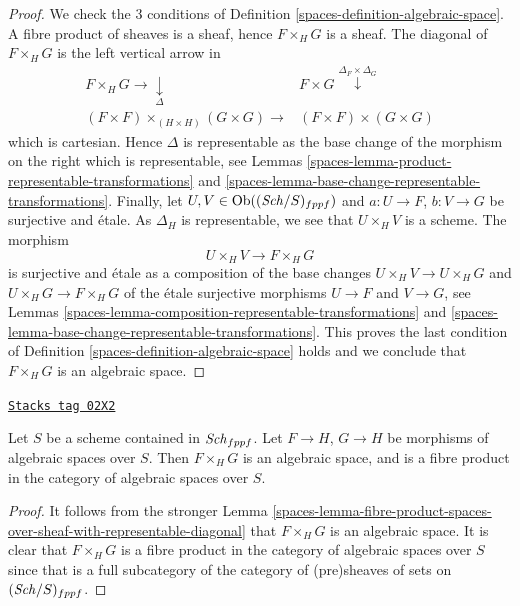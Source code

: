 \begin{proof}

We check the 3 conditions of
Definition \ref{spaces-definition-algebraic-space}.
A fibre product of sheaves is a sheaf, hence $F \times_H G$ is a sheaf.
The diagonal of $F \times_H G$ is the left vertical arrow in
$$
\begin{array}{cc}F \times_H G \longrightarrow\underset{\Delta}{\downarrow} & F \times G \overset{\Delta_F \times \Delta_G}{\downarrow} \\ (F \times F) \times_{(H \times H)} (G \times G) \longrightarrow & (F \times F) \times (G \times G)\end{array}
$$
which is cartesian. Hence $\Delta$ is representable as the base change
of the morphism on the right which is representable, see
Lemmas \ref{spaces-lemma-product-representable-transformations} and
\ref{spaces-lemma-base-change-representable-transformations}.
Finally, let $U, V \in \operatorname{Ob}((\mathit{Sch}/S)_{fppf})$
and $a : U \to F$, $b : V \to G$ be surjective and \'etale.
As $\Delta_H$ is representable, we see that $U \times_H V$ is a scheme.
The morphism
$$
U \times_H V \longrightarrow F \times_H G
$$
is surjective and \'etale as a composition of the base changes
$U \times_H V \to U \times_H G$ and $U \times_H G \to F \times_H G$
of the \'etale surjective morphisms $U \to F$ and $V \to G$, see
Lemmas \ref{spaces-lemma-composition-representable-transformations} and
\ref{spaces-lemma-base-change-representable-transformations}.
This proves the last condition of
Definition \ref{spaces-definition-algebraic-space}
holds and we conclude that $F \times_H G$ is an algebraic space.
\end{proof}

\begin{lemma}
\label{spaces-lemma-fibre-product-spaces}
\href{https://stacks.math.columbia.edu/tag/02X2}{\texttt{Stacks tag 02X2}}

Let $S$ be a scheme contained in $\mathit{Sch}_{fppf}$.
Let $F \to H$, $G \to H$ be morphisms of algebraic spaces over $S$.
Then $F \times_H G$ is an algebraic space, and is a fibre product
in the category of algebraic spaces over $S$.
\end{lemma}

\begin{proof}

It follows from the stronger
Lemma \ref{spaces-lemma-fibre-product-spaces-over-sheaf-with-representable-diagonal}
that $F \times_H G$ is an algebraic space.
It is clear that $F \times_H G$
is a fibre product in the category of algebraic spaces over $S$
since that is a full subcategory of the category
of (pre)sheaves of sets on $(\mathit{Sch}/S)_{fppf}$.
\end{proof}

